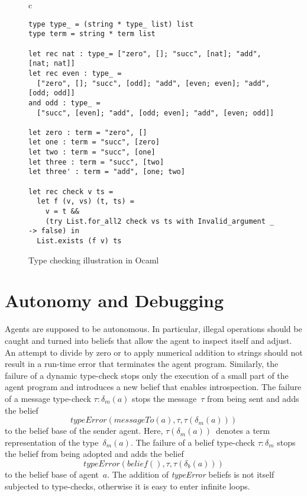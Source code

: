 \documentclass[preprint]{sigplanconf} %
\theoremstyle{remark}
\begin{document}
\begin{figure}\footnotesize %
\begin{center}
\begin{tabular}{c}
\begin{lstlisting}[style=ocaml]
type type_ = (string * type_ list) list
type term = string * term list

let rec nat : type_= ["zero", []; "succ", [nat]; "add", [nat; nat]]
let rec even : type_ =
  ["zero", []; "succ", [odd]; "add", [even; even]; "add", [odd; odd]]
and odd : type_ =
  ["succ", [even]; "add", [odd; even]; "add", [even; odd]]

let zero : term = "zero", []
let one : term = "succ", [zero]
let two : term = "succ", [one]
let three : term = "succ", [two]
let three' : term = "add", [one; two]

let rec check v ts =
  let f (v, vs) (t, ts) =
    v = t &&
    (try List.for_all2 check vs ts with Invalid_argument _ -> false) in
  List.exists (f v) ts
\end{lstlisting}
\end{tabular}
\end{center}
\caption{Type checking illustration in Ocaml}
\label{fig:Type-checker}
\end{figure} %
\section{Autonomy and Debugging} \label{sec:bugs} %

Agents are supposed to be autonomous. In particular, illegal operations
should be caught and turned into beliefs that allow the agent to inspect
itself and adjust. An attempt to divide by zero or to apply numerical
addition to strings should not result in a run-time error that terminates
the agent program. Similarly, the failure of a dynamic type-check stops
only the execution of a small part of the agent program and introduces a
new belief that enables introspection. The failure of a message type-check
$\tau:\delta_m(a)$ stops the message~$\tau$ from being sent and adds the
belief \[\mathit{typeError}(\mathit{messageTo}(a), \tau, \tau(\delta_m(a)))
\] to the belief base of the sender agent. Here,
$\tau(\delta_m(a))$~denotes a term representation of the
type~$\delta_m(a)$.  The failure of a belief type-check $\tau:\delta_m$
stops the belief from being adopted and adds the belief
\[\mathit{typeError}(\mathit{belief}(), \tau, \tau(\delta_b(a))) \] to the
belief base of agent~$a$. The addition of \textit{typeError} beliefs is not
itself subjected to type-checks, otherwise it is easy to enter infinite
loops.
\end{document}
